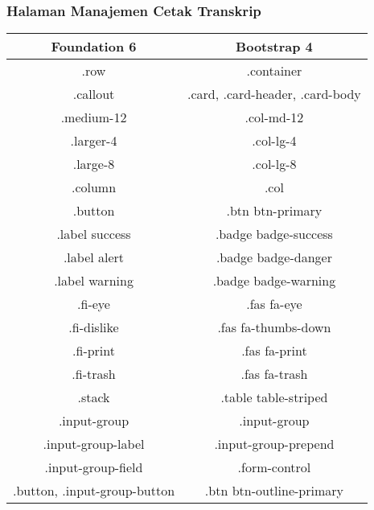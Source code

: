 \subsubsection{Halaman Manajemen Cetak Transkrip}
\begin{tabular}{||c|c||} 
	\hline
	\textbf{Foundation 6} & \textbf{Bootstrap 4}  \\ [0.5ex] 
	\hline\hline
	.row &   .container\\ 
	\hline	
	.callout &  .card, .card-header, .card-body \\
	\hline	
	.medium-12 &  .col-md-12 \\
	\hline	
	.larger-4 &  .col-lg-4 \\
	\hline
	.large-8 &  .col-lg-8 \\
	\hline
	.column &  .col \\	
	\hline	
	.button &  .btn btn-primary\\
	\hline	
	.label success &  .badge badge-success \\
	\hline	
	.label alert & .badge badge-danger  \\
	\hline	
	.label warning & .badge badge-warning  \\
	\hline	
	.fi-eye &  .fas fa-eye \\	
	\hline	
	.fi-dislike &  .fas fa-thumbs-down \\
	\hline	
	.fi-print &  .fas fa-print \\
	\hline	
	.fi-trash &  .fas fa-trash \\
	\hline	
	.stack & .table table-striped  \\
	\hline	
	 .input-group & .input-group  \\ 
	 \hline	
	 .input-group-label & .input-group-prepend  \\ 
	 \hline	
	 .input-group-field& .form-control  \\ 
	 \hline	
	 .button, .input-group-button& .btn btn-outline-primary  \\ [1ex] 
	\hline
\end{tabular}


